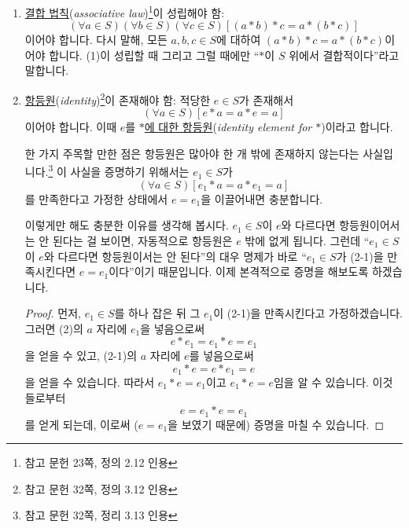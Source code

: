 \documentclass[12pt]{paper}
\begin{document}
  \begin{enumerate}
    \item \underline{결합 법칙}(\textit{associative law})\footnote{참고 문헌 \cite{fraleigh2009} 23쪽, 정의 2.12 인용}이 성립해야 함:
    \begin{equation*}
      \left( \forall a \in S \right) \left( \forall b \in S \right) \left( \forall c \in S \right) \left[ \left( a * b \right) * c = a * \left( b * c \right) \right] \tag{1}
    \end{equation*}
    이어야 합니다.
    다시 말해, 모든 $a , b , c \in S$에 대하여 $\left( a * b \right) * c = a * \left( b * c \right)$이어야 합니다.
    (1)이 성립할 때 그리고 그럴 때에만 ``$*$이 $S$ 위에서 결합적이다''라고 말합니다.

    \item \underline{항등원}(\textit{identity})\footnote{참고 문헌 \cite{fraleigh2009} 32쪽, 정의 3.12 인용}이 존재해야 함:
    적당한 $e \in S$가 존재해서
    \begin{equation*}
      \left( \forall a \in S \right) \left[ e * a = a * e = a \right] \tag{2}
    \end{equation*}
    이어야 합니다.
    이때 $e$를 \underline{$*$에 대한 항등원}(\textit{identity element for $*$})이라고 합니다.
    
    한 가지 주목할 만한 점은 항등원은 많아야 한 개 밖에 존재하지 않는다는 사실입니다.\footnote{참고 문헌 \cite{fraleigh2009} 32쪽, 정리 3.13 인용}
    이 사실을 증명하기 위해서는 $e_1 \in S$가 
    \begin{equation*}
      \left( \forall a \in S \right) \left[ e_1 * a = a * e_1 = a \right] \tag{2-1}
    \end{equation*}
    를 만족한다고 가정한 상태에서 $e = e_1$을 이끌어내면 충분합니다.
    
    이렇게만 해도 충분한 이유를 생각해 봅시다.
    $e_1 \in S$이 $e$와 다르다면 항등원이어서는 안 된다는 걸 보이면,
    자동적으로 항등원은 $e$ 밖에 없게 됩니다.
    그런데 ``$e_1 \in S$이 $e$와 다르다면 항등원이서는 안 된다''의 대우 명제가 바로 ``$e_1 \in S$가 (2-1)을 만족시킨다면 $e = e_1$이다''이기 때문입니다.
    이제 본격적으로 증명을 해보도록 하겠습니다.

    \begin{proof}
      먼저, $e_1 \in S$를 하나 잡은 뒤 그 $e_1$이 (2-1)을 만족시킨다고 가정하겠습니다.
      그러면 (2)의 $a$ 자리에 $e_1$을 넣음으로써 $$e * e_1 = e_1 * e = e_1$$을 얻을 수 있고,
      (2-1)의 $a$ 자리에 $e$를 넣음으로써 $$e_1 * e = e * e_1 = e$$을 얻을 수 있습니다.
      따라서 $e_1 * e = e_1$이고 $e_1 * e = e$임을 알 수 있습니다.
      이것들로부터 $$e = e_1 * e = e_1$$를 얻게 되는데,
      이로써 ($e = e_1$을 보였기 때문에) 증명을 마칠 수 있습니다.
    \end{proof}


\end{enumerate}
\end{document}
